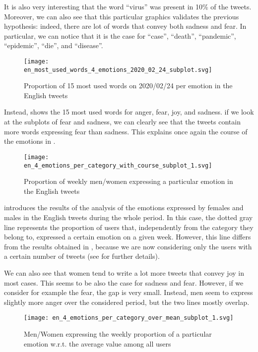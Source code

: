It is also very interesting that the word “virus” was present in 10\% of the tweets. Moreover, we can also see that this particular graphics validates the previous hypothesis: indeed, there are lot of words that convey both sadness and fear. In particular, we can notice that it is the case for “case”, “death”, “pandemic”, “epidemic”, “die”, and “disease”.

\begin{figure}[H]
	\centering
    	\texttt{[image: en\_most\_used\_words\_4\_emotions\_2020\_02\_24\_subplot.svg]}
    	\caption{Proportion of 15 most used words on 2020/02/24 per emotion in the English tweets}
    	\label{fig:en-most-used-word-subplot-2020-02-24}
\end{figure}

Instead,  shows the 15 most used words for anger, fear, joy, and sadness. if we look at the subplots of fear and sadness, we can clearly see that the tweets contain more words expressing fear than sadness. This explains once again the course of the emotions in .

\begin{figure}[H]
	\centering
    	\texttt{[image: en\_4\_emotions\_per\_category\_with\_course\_subplot\_1.svg]}
    	\caption{Proportion of weekly men/women expressing a particular emotion in the English tweets}
    	\label{fig:en-4-emotions-per-category-course-subplot-1}
\end{figure}

 introduces the results of the analysis of the emotions expressed by females and males in the English tweets during the whole period. In this case, the dotted gray line represents the proportion of users that, independently from the category they belong to, expressed a certain emotion on a given week. However, this line differs from the results obtained in , because we are now considering only the users with a certain number of tweets (see  for further details).

We can also see that women tend to write a lot more tweets that convey joy in most cases. This seems to be also the case for sadness and fear. However, if we consider for example the fear, the gap is very small. Instead, men seem to express slightly more anger over the considered period, but the two lines mostly overlap.

\begin{figure}[H]
	\centering
    	\texttt{[image: en\_4\_emotions\_per\_category\_over\_mean\_subplot\_1.svg]}
    	\caption{Men/Women expressing the weekly proportion of a particular emotion w.r.t. the average value among all users}
    	\label{fig:en-4-emotions-per-category-course-mean-1}
\end{figure}

